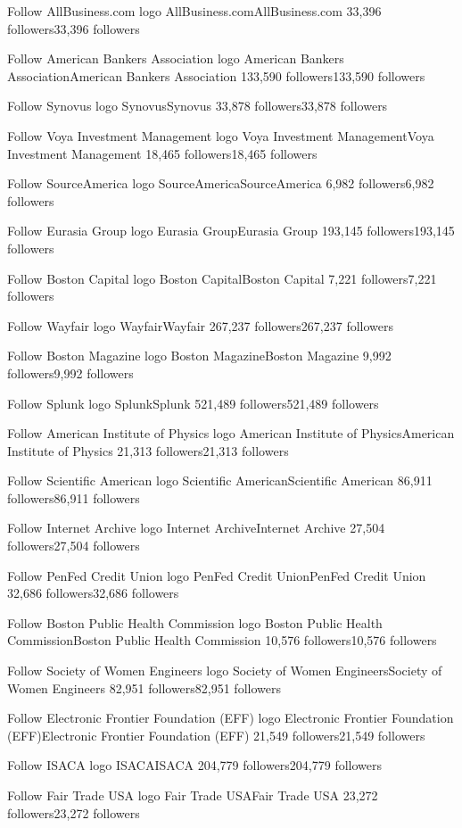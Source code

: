 Follow
AllBusiness.com logo
AllBusiness.comAllBusiness.com
33,396 followers33,396 followers

Follow
American Bankers Association logo
American Bankers AssociationAmerican Bankers Association
133,590 followers133,590 followers

Follow
Synovus logo
SynovusSynovus
33,878 followers33,878 followers

Follow
Voya Investment Management logo
Voya Investment ManagementVoya Investment Management
18,465 followers18,465 followers

Follow
SourceAmerica logo
SourceAmericaSourceAmerica
6,982 followers6,982 followers

Follow
Eurasia Group logo
Eurasia GroupEurasia Group
193,145 followers193,145 followers

Follow
Boston Capital logo
Boston CapitalBoston Capital
7,221 followers7,221 followers

Follow
Wayfair logo
WayfairWayfair
267,237 followers267,237 followers

Follow
Boston Magazine logo
Boston MagazineBoston Magazine
9,992 followers9,992 followers

Follow
Splunk logo
SplunkSplunk
521,489 followers521,489 followers

Follow
American Institute of Physics logo
American Institute of PhysicsAmerican Institute of Physics
21,313 followers21,313 followers

Follow
Scientific American logo
Scientific AmericanScientific American
86,911 followers86,911 followers

Follow
Internet Archive logo
Internet ArchiveInternet Archive
27,504 followers27,504 followers

Follow
PenFed Credit Union logo
PenFed Credit UnionPenFed Credit Union
32,686 followers32,686 followers

Follow
Boston Public Health Commission logo
Boston Public Health CommissionBoston Public Health Commission
10,576 followers10,576 followers

Follow
Society of Women Engineers logo
Society of Women EngineersSociety of Women Engineers
82,951 followers82,951 followers

Follow
Electronic Frontier Foundation (EFF) logo
Electronic Frontier Foundation (EFF)Electronic Frontier Foundation (EFF)
21,549 followers21,549 followers

Follow
ISACA logo
ISACAISACA
204,779 followers204,779 followers

Follow
Fair Trade USA logo
Fair Trade USAFair Trade USA
23,272 followers23,272 followers

